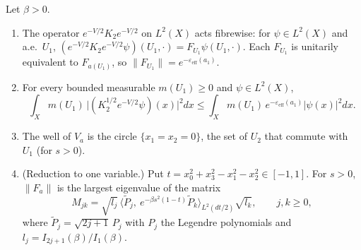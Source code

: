 \begin{lemma}\label{tu:U-R}
Let $\beta>0$.
\begin{enumerate}
\item The operator $e^{-V/2}K_2e^{-V/2}$ on $L^2(X)$ acts fibrewise: for $\psi\in L^2(X)$ and a.e.\ $U_1$,
$(e^{-V/2}K_2e^{-V/2}\psi)(U_1,\cdot)=F_{U_1}\psi(U_1,\cdot)$. Each $F_{U_1}$ is unitarily equivalent to
$F_{a(U_1)}$, so $\|F_{U_1}\|=e^{-\varepsilon_{\mathrm{eff}}(a_1)}$.
\item For every bounded measurable $m(U_1)\ge0$ and $\psi\in L^2(X)$,
\[
\int_X m(U_1)\,\bigl|(K_2^{1/2}e^{-V/2}\psi)(x)\bigr|^2dx\le\int_Xm(U_1)\,e^{-\varepsilon_{\mathrm{eff}}(a_1)}|\psi(x)|^2dx .
\]
\item The well of $V_a$ is the circle $\{x_1=x_2=0\}$, the set of $U_2$ that commute with $U_1$ (for $s>0$).
\item (Reduction to one variable.) Put $t=x_0^2+x_3^2-x_1^2-x_2^2\in[-1,1]$. For $s>0$, $\|F_a\|$ is the
largest eigenvalue of the matrix
\[
M_{jk}=\sqrt{l_j}\,\bigl\langle\tilde P_j,\ e^{-\beta s^2(1-t)}\tilde P_k\bigr\rangle_{L^2(dt/2)}\sqrt{l_k},\qquad j,k\ge0,
\]
where $\tilde P_j=\sqrt{2j+1}\,P_j$ with $P_j$ the Legendre polynomials and $l_j=I_{2j+1}(\beta)/I_1(\beta)$.
\end{enumerate}
\end{lemma}

